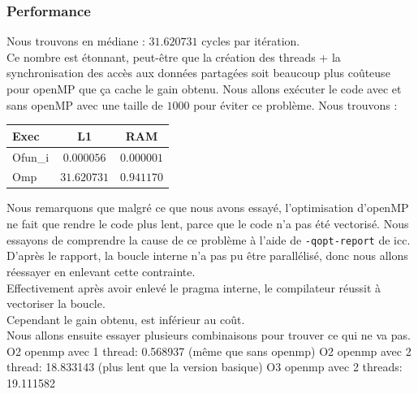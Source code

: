 \documentclass{report}
\begin{document}
  \subsubsection{Performance}
  Nous trouvons en médiane : $31.620731$ cycles par itération.\\
  Ce nombre est étonnant, peut-être que la création des threads + la synchronisation
  des accès aux données partagées soit beaucoup plus coûteuse pour openMP que ça cache le gain obtenu.
  Nous allons exécuter le code avec et sans openMP avec une taille de $1000$ pour éviter ce problème.
  Nous trouvons :
  \begin{center}
    \begin{tabular}{ | l | c | c | }
      \hline
      Exec    & L1          & RAM         \\ \hline
      Ofun\_i & $0.000056$  & $0.000001$  \\ \hline
      Omp     & $31.620731$ & $0.941170$  \\ \hline
    \end{tabular}
  \end{center}
  Nous remarquons que malgré ce que nous avons essayé, l'optimisation d'openMP ne fait que rendre
  le code plus lent, parce que le code n'a pas été vectorisé.
  Nous essayons de comprendre la cause de ce problème à l'aide de \texttt{-qopt-report} de icc.
  D'après le rapport, la boucle interne n'a pas pu être parallélisé, donc nous allons réessayer
  en enlevant cette contrainte.\\
  Effectivement après avoir enlevé le pragma interne, le compilateur réussit à vectoriser la boucle.\\
  Cependant le gain obtenu, est inférieur au coût.\\
  Nous allons ensuite essayer plusieurs combinaisons pour trouver ce qui ne va pas.
  O2 openmp  avec 1 thread: 0.568937 (même que sans openmp)
  O2 openmp  avec 2 thread: 18.833143 (plus lent que la version basique)
  O3 openmp  avec 2 threads: 19.111582
\end{document}

